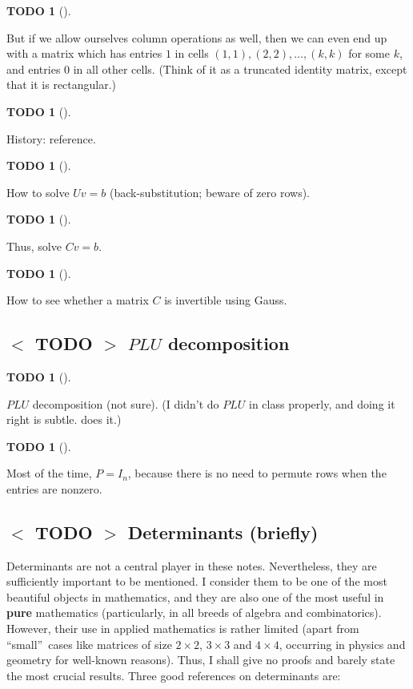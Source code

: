 \documentclass[numbers=enddot,12pt,final,onecolumn,notitlepage]{scrartcl}%
\theoremstyle{definition}
\newtheorem{quest}[theo]{TODO}
\newenvironment{todo}[1][]
{\begin{quest}[#1]\begin{leftbar}}
{\end{leftbar}\end{quest}}
\begin{document}
\begin{todo}
But if we allow ourselves column operations as well, then we can even end up
with a matrix which has entries $1$ in cells $\left(  1,1\right)  ,\left(
2,2\right)  ,\ldots,\left(  k,k\right)  $ for some $k$, and entries $0$ in all
other cells. (Think of it as a truncated identity matrix, except that it is rectangular.)
\end{todo}

\begin{todo}
History: \cite{Grcar10} reference.
\end{todo}

\begin{todo}
How to solve $Uv=b$ (back-substitution; beware of zero rows).
\end{todo}

\begin{todo}
Thus, solve $Cv=b$.
\end{todo}

\begin{todo}
How to see whether a matrix $C$ is invertible using Gauss.
\end{todo}

\subsection{%
$<$%
TODO%
$>$
$PLU$ decomposition}

\begin{todo}
$PLU$ decomposition (not sure). (I didn't do $PLU$ in class properly, and
doing it right is subtle. \cite[Example 1.12]{OlvSha06} does it.)
\end{todo}

\begin{todo}
Most of the time, $P=I_{n}$, because there is no need to permute rows when the
entries are nonzero.
\end{todo}

\subsection{%
$<$%
TODO%
$>$
Determinants (briefly)}

Determinants are not a central player in these notes. Nevertheless, they are
sufficiently important to be mentioned. I consider them to be one of the most
beautiful objects in mathematics, and they are also one of the most useful in
\textbf{pure} mathematics (particularly, in all breeds of algebra and
combinatorics). However, their use in applied mathematics is rather limited
(apart from \textquotedblleft small\textquotedblright\ cases like matrices of
size $2\times2$, $3\times3$ and $4\times4$, occurring in physics and geometry
for well-known reasons). Thus, I shall give no proofs and barely state the
most crucial results. Three good references on determinants are:
\end{document}
